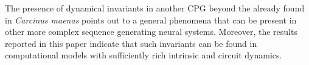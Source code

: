 
The presence of dynamical invariants in another CPG beyond the already found in \textit{Carcinus maenas} \cite{elices_robust_2019} points out to a general phenomena that can be present in other more complex sequence generating neural systems. Moreover, the results reported in this paper indicate that such invariants can be found in computational models with sufficiently rich intrinsic and circuit dynamics.
